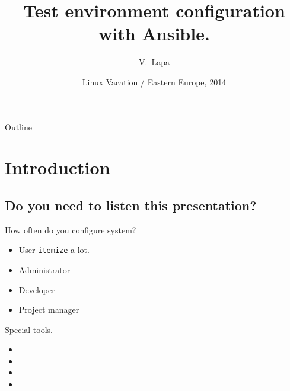 \documentclass{beamer}
\title %
{Test environment configuration with Ansible.}
\author[Lapa] %
{V.~Lapa\inst{1}}
\institute[EPAM Systems] %
\date[LVEE 2014] %
{ Linux Vacation / Eastern Europe, 2014}
\begin{document}
\begin{frame}
  \titlepage
\end{frame}

\begin{frame}{Outline}
  \tableofcontents
\end{frame}





\section{Introduction}

\subsection{ Do you need to listen this presentation? }

\begin{frame}{How often do you configure system?}

  \begin{itemize}
  \item
     User \texttt{itemize} a lot.
  \item
     Administrator
  \item
     Developer
  \item
     Project manager
  \end{itemize}
\end{frame}

\begin{frame}{Special tools.}
  \begin{itemize}
  \item
  \item
  \item
  \item
  \end{itemize}
\end{frame}
\end{document}
